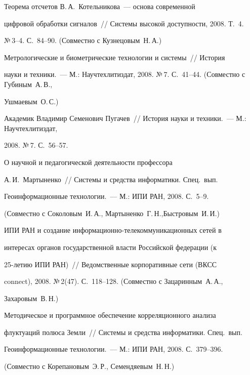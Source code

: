  Теорема отсчетов В.\,А.~Котельникова~--- основа современной


цифровой обработки сигналов~// Системы высокой доступности, 2008. Т.~4.


№\,3--4. С.~84--90. (Совместно с Кузнецовым~Н.\,А.)





 Метрологические и биометрические технологии и системы~// История


науки и техники.~--- М.: Научтехлитиздат, 2008. №\,7. С.~41--44. (Совместно с Губиным~А.\,В.,


Ушмаевым~О.\,С.)





 Академик Владимир Семенович Пугачев~// История науки и техники.~--- М.: Научтехлитиздат,


2008. №\,7. С.~56--57.





 О научной и педагогической деятельности профессора\linebreak


А.\,И.~Мартыненко~// Системы и средства информатики. Спец.\ вып.\


Геоинформационные технологии.~--- М.: ИПИ РАН, 2008. С.~5--9.


(Совместно с Соколовым~И.\,А., Мартыненко~Г.\,Н.,\linebreak Быстровым~И.\,И.)





 ИПИ РАН и создание информационно-те\-ле\-ком\-му\-ни\-ка\-ци\-он\-ных сетей в


интересах органов государственной власти Российской федерации (к


 25-ле\-тию ИПИ РАН)~// Ведомственные корпоративные сети (ВКСС


connect), 2008. №\,2(47). С.~118--128. (Совместно с Зацаринным~А.\,А.,


Захаровым~В.\,Н.)





 Методическое и программное обеспечение корреляционного анализа


флуктуаций полюса Земли~// Системы и средства информатики. Спец.\ вып.\


Геоинформационные технологии.~--- М.: ИПИ РАН, 2008. С.~379--396.


(Совместно с Корепановым~Э.\,Р., Семендяевым~Н.\,Н.)





